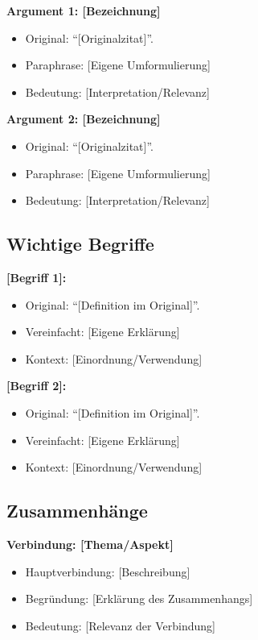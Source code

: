 \documentclass[a4paper,12pt]{article}
\begin{document}
\textbf{Argument 1: [Bezeichnung]}

\begin{itemize}
    \item Original: \enquote{[Originalzitat]}\parencite{[Key]}.
    \item Paraphrase: [Eigene Umformulierung]
    \item Bedeutung: [Interpretation/Relevanz]
\end{itemize}

\vspace{0.5cm}
\textbf{Argument 2: [Bezeichnung]}

\begin{itemize}
    \item Original: \enquote{[Originalzitat]}\parencite{[Key]}.
    \item Paraphrase: [Eigene Umformulierung]
    \item Bedeutung: [Interpretation/Relevanz]
\end{itemize}

\subsection{Wichtige Begriffe}

\textbf{[Begriff 1]:}

\begin{itemize}
    \item Original: \enquote{[Definition im Original]}\parencite{[Key]}.
    \item Vereinfacht: [Eigene Erklärung]
    \item Kontext: [Einordnung/Verwendung]
\end{itemize}

\textbf{[Begriff 2]:}

\begin{itemize}
    \item Original: \enquote{[Definition im Original]}\parencite{[Key]}.
    \item Vereinfacht: [Eigene Erklärung]
    \item Kontext: [Einordnung/Verwendung]
\end{itemize}

\subsection{Zusammenhänge}

\textbf{Verbindung: [Thema/Aspekt]}

\begin{itemize}
    \item Hauptverbindung: [Beschreibung]
    \item Begründung: [Erklärung des Zusammenhangs]
    \item Bedeutung: [Relevanz der Verbindung]
\end{itemize}
\end{document}
